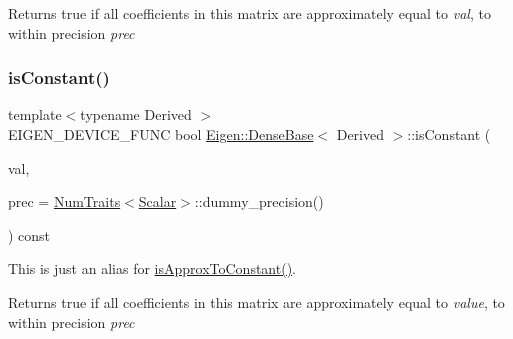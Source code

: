 \begin{DoxyReturn}{Returns}
true if all coefficients in this matrix are approximately equal to {\itshape val}, to within precision {\itshape prec} 
\end{DoxyReturn}
\mbox{\label{class_eigen_1_1_dense_base_aba0e5df04cf80214d8298aa8dd41acbd}} 
\subsubsection{\texorpdfstring{isConstant()}{isConstant()}}
{\footnotesize\ttfamily template$<$typename Derived $>$ \\
E\+I\+G\+E\+N\+\_\+\+D\+E\+V\+I\+C\+E\+\_\+\+F\+U\+NC bool \mbox{\hyperlink{class_eigen_1_1_dense_base}{Eigen\+::\+Dense\+Base}}$<$ Derived $>$\+::is\+Constant (\begin{DoxyParamCaption}\item[{const \mbox{\hyperlink{class_eigen_1_1_dense_base_a5feed465b3a8e60c47e73ecce83e39a2}{Scalar}} \&}]{val,  }\item[{const Real\+Scalar \&}]{prec = {\ttfamily \mbox{\hyperlink{struct_eigen_1_1_num_traits}{Num\+Traits}}$<$\mbox{\hyperlink{class_eigen_1_1_dense_base_a5feed465b3a8e60c47e73ecce83e39a2}{Scalar}}$>$\+:\+:dummy\+\_\+precision()} }\end{DoxyParamCaption}) const}

This is just an alias for \mbox{\hyperlink{class_eigen_1_1_dense_base_aafb86c9868d3d9076e01e4fc54c93e81}{is\+Approx\+To\+Constant()}}.

\begin{DoxyReturn}{Returns}
true if all coefficients in this matrix are approximately equal to {\itshape value}, to within precision {\itshape prec} 
\end{DoxyReturn}
\mbox{\label{class_eigen_1_1_dense_base_adfca6ff4e473f68fbbeabbd03b7504a9}} 
